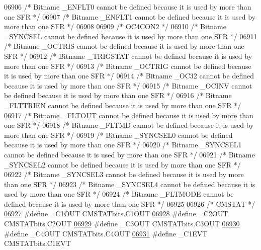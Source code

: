 \begin{DoxyCode}
06906 \textcolor{comment}{/* Bitname \_ENFLT0 cannot be defined because it is used by more than one SFR */}
06907 \textcolor{comment}{/* Bitname \_ENFLT1 cannot be defined because it is used by more than one SFR */}
06908 
06909 \textcolor{comment}{/* OC4CON2 */}
06910 \textcolor{comment}{/* Bitname \_SYNCSEL cannot be defined because it is used by more than one SFR */}
06911 \textcolor{comment}{/* Bitname \_OCTRIS cannot be defined because it is used by more than one SFR */}
06912 \textcolor{comment}{/* Bitname \_TRIGSTAT cannot be defined because it is used by more than one SFR */}
06913 \textcolor{comment}{/* Bitname \_OCTRIG cannot be defined because it is used by more than one SFR */}
06914 \textcolor{comment}{/* Bitname \_OC32 cannot be defined because it is used by more than one SFR */}
06915 \textcolor{comment}{/* Bitname \_OCINV cannot be defined because it is used by more than one SFR */}
06916 \textcolor{comment}{/* Bitname \_FLTTRIEN cannot be defined because it is used by more than one SFR */}
06917 \textcolor{comment}{/* Bitname \_FLTOUT cannot be defined because it is used by more than one SFR */}
06918 \textcolor{comment}{/* Bitname \_FLTMD cannot be defined because it is used by more than one SFR */}
06919 \textcolor{comment}{/* Bitname \_SYNCSEL0 cannot be defined because it is used by more than one SFR */}
06920 \textcolor{comment}{/* Bitname \_SYNCSEL1 cannot be defined because it is used by more than one SFR */}
06921 \textcolor{comment}{/* Bitname \_SYNCSEL2 cannot be defined because it is used by more than one SFR */}
06922 \textcolor{comment}{/* Bitname \_SYNCSEL3 cannot be defined because it is used by more than one SFR */}
06923 \textcolor{comment}{/* Bitname \_SYNCSEL4 cannot be defined because it is used by more than one SFR */}
06924 \textcolor{comment}{/* Bitname \_FLTMODE cannot be defined because it is used by more than one SFR */}
06925 
06926 \textcolor{comment}{/* CMSTAT */}
\hypertarget{a00009_source_l06927}{}\hyperlink{a00009_a893a2b1d497d00713d200f81140cb9e7}{06927} \textcolor{preprocessor}{#define \_C1OUT CMSTATbits.C1OUT}
\hypertarget{a00009_source_l06928}{}\hyperlink{a00009_a479960c791e0c717b96b8790c86e8175}{06928} \textcolor{preprocessor}{#define \_C2OUT CMSTATbits.C2OUT}
\hypertarget{a00009_source_l06929}{}\hyperlink{a00009_afc99a9f1bc70de44616dee28db12fb2f}{06929} \textcolor{preprocessor}{#define \_C3OUT CMSTATbits.C3OUT}
\hypertarget{a00009_source_l06930}{}\hyperlink{a00009_a76939cbe9a8a057226c8819155e969c5}{06930} \textcolor{preprocessor}{#define \_C4OUT CMSTATbits.C4OUT}
\hypertarget{a00009_source_l06931}{}\hyperlink{a00009_a6742f041dbe63a1670686391810bb50e}{06931} \textcolor{preprocessor}{#define \_C1EVT CMSTATbits.C1EVT}

\end{DoxyCode}
